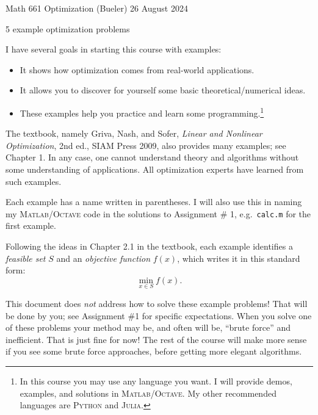 \documentclass[11pt]{amsart}
\newcommand{\Julia}{\textsc{Julia}\xspace}
\newcommand{\Matlab}{\textsc{Matlab}\xspace}
\newcommand{\Octave}{\textsc{Octave}\xspace}
\newcommand{\Python}{\textsc{Python}\xspace}
\begin{document}
\scriptsize \noindent Math 661 Optimization (Bueler) \hfill 26 August 2024
\normalsize

\medskip\bigskip
\Large
\centerline{5 example optimization problems}

\bigskip\medskip
\normalsize

\thispagestyle{empty}

I have several goals in starting this course with examples:
\begin{itemize}
\item It shows how optimization comes from real-world applications.
\item It allows you to discover for yourself some basic theoretical/numerical ideas.
\item These examples help you practice and learn some programming.\footnote{In this course you may use any language you want.  I will provide demos, examples, and solutions in \Matlab/\Octave.  My other recommended languages are \Python and \Julia.}
\end{itemize}
The textbook, namely Griva, Nash, and Sofer, \emph{Linear and Nonlinear Optimization}, 2nd ed., SIAM Press 2009, also provides many examples; see Chapter 1.  In any case, one cannot understand theory and algorithms without some understanding of applications.  All optimization experts have learned from such examples.

Each example has a name written in parentheses.  I will also use this in naming my \Matlab/\Octave code in the solutions to Assignment \# 1, e.g.~\texttt{calc.m} for the first example.

Following the ideas in Chapter 2.1 in the textbook, each example identifies a \emph{feasible set} $S$ and an \emph{objective function} $f(x)$, which writes it in this standard form:
    $$\min_{x\in S} f(x).$$

This document does \emph{not} address how to solve these example problems!  That will be done by you; see Assignment \#1 for specific expectations.  When you solve one of these problems your method may be, and often will be, ``brute force'' and inefficient.  That is just fine for now!  The rest of the course will make more sense if you see some brute force approaches, before getting more elegant algorithms.
\end{document}

